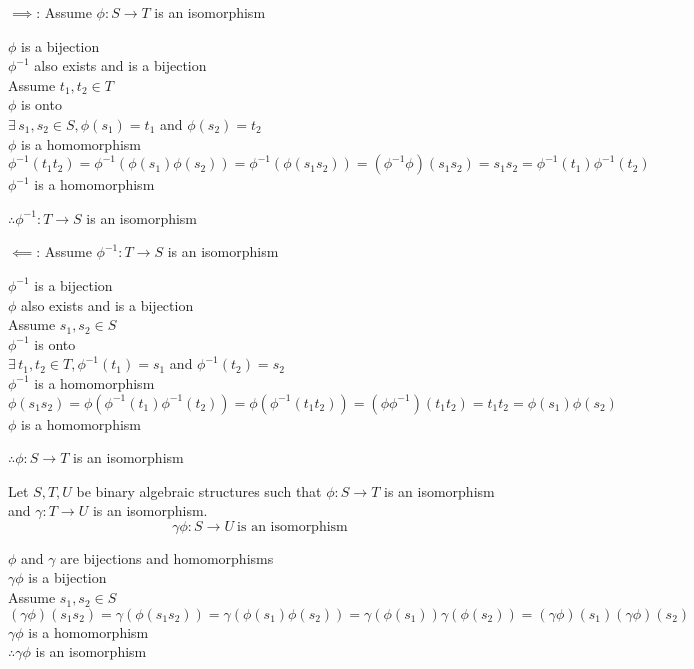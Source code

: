 \documentclass[letterpaper,12pt,fleqn]{article}
\newcommand{\g}{\gamma}
\newcommand{\p}{\phi}
\begin{document}
\begin{theproof}
\listbreak
\begin{description}
\item{$\implies$}: Assume $\p:S\to T$ is an isomorphism

$\p$ is a bijection \\
$\p^{-1}$ also exists and is a bijection \\
Assume $t_1,t_2\in T$ \\
$\p$ is onto \\
$\exists\,s_1,s_2\in S,\p(s_1)=t_1$ and $\p(s_2)=t_2$ \\
$\p$ is a homomorphism \\
$\p^{-1}(t_1t_2)=\p^{-1}(\p(s_1)\p(s_2))=\p^{-1}(\p(s_1s_2))=
    (\p^{-1}\p)(s_1s_2)=s_1s_2=\p^{-1}(t_1)\p^{-1}(t_2)$ \\
$\p^{-1}$ is a homomorphism

$\therefore \p^{-1}:T\to S$ is an isomorphism \\

\item{$\impliedby$}: Assume $\p^{-1}:T\to S$ is an isomorphism

$\p^{-1}$ is a bijection \\
$\p$ also exists and is a bijection \\
Assume $s_1,s_2\in S$ \\
$\p^{-1}$ is onto \\
$\exists\,t_1,t_2\in T,\p^{-1}(t_1)=s_1$ and $\p^{-1}(t_2)=s_2$ \\
$\p^{-1}$ is a homomorphism \\
$\p(s_1s_2)=\p(\p^{-1}(t_1)\p^{-1}(t_2))=\p(\p^{-1}(t_1t_2))=
    (\p\p^{-1})(t_1t_2)=t_1t_2=\p(s_1)\p(s_2)$ \\
$\p$ is a homomorphism

$\therefore \p:S\to T$ is an isomorphism \\
\end{description}
\end{theproof}

\begin{theorem}
Let $S,T,U$ be binary algebraic structures such that $\p:S\to T$ is an
isomorphism and $\g:T\to U$ is an isomorphism.
\[\g\p:S\to U\ \mbox{is an isomorphism}\]
\end{theorem}

\begin{theproof}
$\p$ and $\g$ are bijections and homomorphisms \\
$\g\p$ is a bijection \\
Assume $s_1,s_2\in S$ \\
$(\g\p)(s_1s_2)=\g(\p(s_1s_2))=\g(\p(s_1)\p(s_2))=\g(\p(s_1))\g(\p(s_2))=
(\g\p)(s_1)(\g\p)(s_2)$ \\
$\g\p$ is a homomorphism \\
$\therefore \g\p$ is an isomorphism
\end{theproof}
\end{document}
